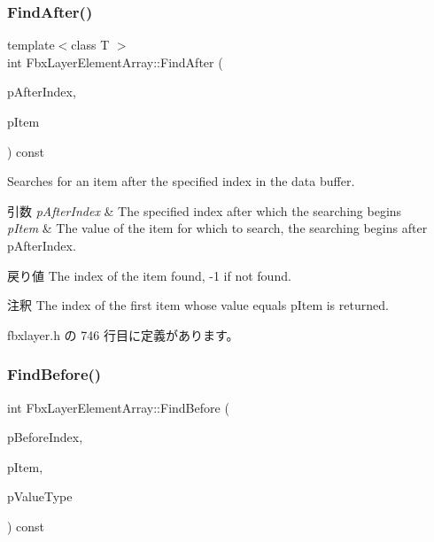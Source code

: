 \subsubsection{\texorpdfstring{Find\+After()}{FindAfter()}\hspace{0.1cm}{\footnotesize\ttfamily [2/2]}}
{\footnotesize\ttfamily template$<$class T $>$ \\
int Fbx\+Layer\+Element\+Array\+::\+Find\+After (\begin{DoxyParamCaption}\item[{int}]{p\+After\+Index,  }\item[{T const \&}]{p\+Item }\end{DoxyParamCaption}) const\hspace{0.3cm}{\ttfamily [inline]}}

Searches for an item after the specified index in the data buffer. 
\begin{DoxyParams}{引数}
{\em p\+After\+Index} & The specified index after which the searching begins \\
\hline
{\em p\+Item} & The value of the item for which to search, the searching begins after p\+After\+Index. \\
\hline
\end{DoxyParams}
\begin{DoxyReturn}{戻り値}
The index of the item found, -\/1 if not found. 
\end{DoxyReturn}
\begin{DoxyRemark}{注釈}
The index of the first item whose value equals p\+Item is returned. 
\end{DoxyRemark}


 fbxlayer.\+h の 746 行目に定義があります。

\mbox{\label{class_fbx_layer_element_array_a98daeb1cd39978cda3a4dd83b32e508d}} 
\subsubsection{\texorpdfstring{Find\+Before()}{FindBefore()}\hspace{0.1cm}{\footnotesize\ttfamily [1/2]}}
{\footnotesize\ttfamily int Fbx\+Layer\+Element\+Array\+::\+Find\+Before (\begin{DoxyParamCaption}\item[{int}]{p\+Before\+Index,  }\item[{const void $\ast$}]{p\+Item,  }\item[{\hyperlink{fbxpropertytypes_8h_a73913a5ddfb20e57c6f25e9e6784bd92}{E\+Fbx\+Type}}]{p\+Value\+Type }\end{DoxyParamCaption}) const}

